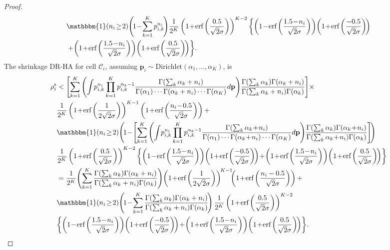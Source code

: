 \documentclass[10pt,journal,compsoc]{IEEEtran}
\newcommand{\p}{\mathbf{p}}
\newcommand{\C}{\mathcal{C}}
\begin{document}
\begin{proof}
\begin{align*}
&\mathbbm{1}(n_i\!\ge\!2)\!\left(\!1\!-\!\sum_{k=1}^K p_{i,k}^{n_i}\!\right)\!\frac{1}{2^K}\left(1\!+\!\mbox{erf}\left(\frac{0.5}{\sqrt{2}\sigma}\right)\right)^{K-2}\bigg\{\!\left(1\!-\!\mbox{erf}\left(\frac{1.5\!-\!n_i}{\sqrt{2}\sigma}\right)\right)\!\left(1\!+\!\mbox{erf}\left(\frac{-0.5}{\sqrt{2}\sigma}\right)\!\right)\\
&+\!\left(1\!+\!\mbox{erf}\left(\frac{1.5\!-\!n_i}{\sqrt{2}\sigma}\right)\right)\!\left(1\!+\!\mbox{erf}\left(\frac{0.5}{\sqrt{2}\sigma}\right)\!\right)\!\bigg\}.
\end{align*}
The shrinkage DR-HA for cell $\C_i$, assuming $\p_i\sim\mbox{Dirichlet}(\alpha_1,\dots,\alpha_K)$, is
\begin{align*}
\rho_i^{\text{s}}&<\left[
\sum_{k=1}^{K}\left(\int\!p_{i,k}^{n_i}\prod_{k=1}^{K}p_{i,k}^{\alpha_k-1}\frac{\Gamma(\sum_k\alpha_k+n_i)}{\Gamma(\alpha_1)\cdots\Gamma(\alpha_k+n_i)\cdots\Gamma(\alpha_K)}d\mathbf{p}\right)\!\frac{\Gamma(\sum_k\alpha_k)\Gamma(\alpha_k+n_i)}{\Gamma(\sum_k\alpha_k+n_i)\Gamma(\alpha_k)}\right]\!\times\\
&\frac{1}{2^{K}}\left(1\!+\!\mbox{erf}\left(\frac{1}{2\sqrt{2}\sigma}\right)\right)^{K-1}\left(1\!+\!\mbox{erf}\left(\frac{n_i\!-\!0.5}{\sqrt{2}\sigma}\right)\right)+\\
&\mathbbm{1}(n_i\!\ge\!2)\!\left(\!1\!-\!\left[
\sum_{k=1}^{K}\left(\int\!p_{i,k}^{n_i}\prod_{k=1}^{K}p_{i,k}^{\alpha_k-1}\frac{\Gamma(\sum_k\alpha_k\!+\!n_i)}{\Gamma(\alpha_1)\cdots\Gamma(\alpha_k\!+\!n_i)\cdots\Gamma(\alpha_K)}d\mathbf{p}\right)\!\frac{\Gamma(\sum_k\alpha_k)\Gamma(\alpha_k\!+\!n_i)}{\Gamma(\sum_k\alpha_k\!+\!n_i)\Gamma(\alpha_k)}\right]\!\right)\!\\
&\frac{1}{2^K}\left(1\!+\!\mbox{erf}\left(\frac{0.5}{\sqrt{2}\sigma}\right)\right)^{K-2}\bigg\{\!\left(1\!-\!\mbox{erf}\left(\frac{1.5\!-\!n_i}{\sqrt{2}\sigma}\right)\right)\!\left(1\!+\!\mbox{erf}\left(\frac{-0.5}{\sqrt{2}\sigma}\right)\!\right)\!+\!\left(1\!+\!\mbox{erf}\left(\frac{1.5\!-\!n_i}{\sqrt{2}\sigma}\right)\right)\!\left(1\!+\!\mbox{erf}\left(\frac{0.5}{\sqrt{2}\sigma}\right)\!\right)\!\bigg\}\\
&=\frac{1}{2^{K}}\!\left(
\sum_{k=1}^{K}\frac{\Gamma(\sum_k\alpha_k)\Gamma(\alpha_k+n_i)}{\Gamma(\sum_k\alpha_k+n_i)\Gamma(\alpha_k)}\right)\!\left(1\!+\!\mbox{erf}\left(\frac{1}{2\sqrt{2}\sigma}\right)\right)^{\!K-1\!}\!\!\left(1\!+\!\mbox{erf}\left(\frac{n_i-0.5}{\sqrt{2}\sigma}\right)\right)+\\
&\mathbbm{1}(n_i\!\ge\!2)\!\left(\!1\!-\!
\sum_{k=1}^{K}\frac{\Gamma(\sum_k\alpha_k)\Gamma(\alpha_k+n_i)}{\Gamma(\sum_k\alpha_k+n_i)\Gamma(\alpha_k)}\!\right)\frac{1}{2^K}\left(1\!+\!\mbox{erf}\left(\frac{0.5}{\sqrt{2}\sigma}\right)\right)^{K-2}\\
&\bigg\{\!\left(1\!-\!\mbox{erf}\left(\frac{1.5\!-\!n_i}{\sqrt{2}\sigma}\right)\right)\!\left(1\!+\!\mbox{erf}\left(\frac{-0.5}{\sqrt{2}\sigma}\right)\!\right)\!+\!\left(1\!+\!\mbox{erf}\left(\frac{1.5\!-\!n_i}{\sqrt{2}\sigma}\right)\right)\!\left(1\!+\!\mbox{erf}\left(\frac{0.5}{\sqrt{2}\sigma}\right)\!\right)\!\bigg\}.
\end{align*}
\end{proof}
\end{document}
